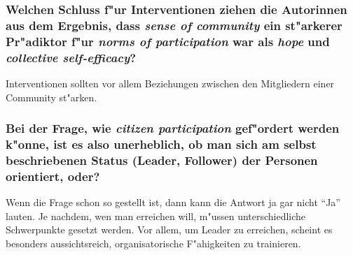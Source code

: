\subsubsection{Welchen Schluss f"ur Interventionen ziehen die Autorinnen aus dem Ergebnis, dass \emph{sense of community} ein st"arkerer Pr"adiktor f"ur \emph{norms of participation} war als \emph{hope} und \emph{collective self-efficacy}?}
Interventionen sollten vor allem Beziehungen zwischen den Mitgliedern einer Community st"arken.

\subsubsection{Bei der Frage, wie \emph{citizen participation} gef"ordert werden k"onne, ist es also unerheblich, ob man sich am selbst beschriebenen Status (Leader, Follower) der Personen orientiert, oder?}
Wenn die Frage schon so gestellt ist, dann kann die Antwort ja gar nicht ``Ja'' lauten. Je nachdem, wen man erreichen will, m"ussen unterschiedliche Schwerpunkte gesetzt werden. Vor allem, um Leader zu erreichen, scheint es besonders aussichtsreich, organisatorische F"ahigkeiten zu trainieren.
